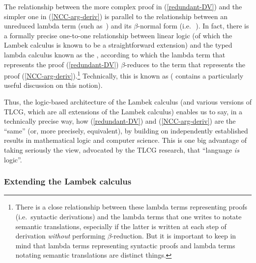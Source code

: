 \documentclass[output=paper
                ,modfonts
 	        ,biblatex
                ,babelshorthands
                ,newtxmath
                ,draftmode
                ,colorlinks, citecolor=brown
]{langscibook}
\begin{document}
The relationship between the more complex proof in (\ref{redundant-DV}) and
the simpler one in (\ref{NCC-arg-deriv}) is parallel to the relationship
between an unreduced lambda term (such as
\,)
and its
$\beta$-normal form (i.e.\  \,).
In fact, there is a formally precise
one-to-one relationship between linear logic (of which the Lambek calculus is known
to be a straightforward extension) and the typed lambda calculus known
as the  \citep{howard80}, according to which
the lambda term that represents the proof 
(\ref{redundant-DV}) $\beta$-reduces  to the term that represents the proof
(\ref{NCC-arg-deriv}).\footnote{There is a close relationship between these
lambda terms representing proofs (i.e.\ syntactic derivations) and the
lambda  terms that one writes 
to notate semantic translations, especially if the latter is written 
at each step of derivation \emph{without} performing $\beta$-reduction. But
it is important to keep in mind that
lambda terms representing syntactic proofs
and lambda terms notating semantic translations are distinct things.}
Technically, this is known as 
(\citealt[36--42, 137--144]{jaeger05} contains a particularly useful discussion on this notion). 

Thus, the logic-based architecture of the Lambek calculus (and various versions of
TLCG, which are all extensions of the Lambek calculus) enables us to say, in a
technically precise way, how (\ref{redundant-DV}) and (\ref{NCC-arg-deriv}) are
the ``same'' (or, more precisely, equivalent), by building on
independently established results in mathematical logic and computer
science. This is one big advantage of taking seriously the view,
advocated by the TLCG research, that ``language \emph{is} logic''.


\subsubsection{Extending the Lambek calculus \label{sec:extending}}
\end{document}
